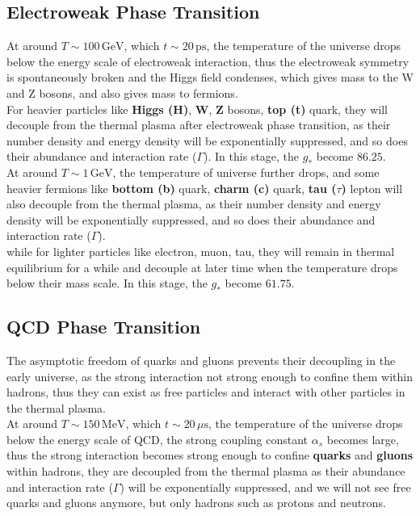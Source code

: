 \subsection{Electroweak Phase Transition}
At around $T \sim 100\,\mathrm{GeV}$, which $t \sim 20\,\mathrm{ps}$, the temperature of the universe drops below the energy scale of electroweak interaction, thus the electroweak symmetry is spontaneously broken and the Higgs field condenses, which gives mass to the W and Z bosons, and also gives mass to fermions. \\

For heavier particles like \textbf{Higgs (H)}, \textbf{W}, \textbf{Z} bosons, \textbf{top (t)} quark, they will decouple from the thermal plasma after electroweak phase transition, as their number density and energy density will be exponentially suppressed, and so does their abundance and interaction rate ($\Gamma$). In this stage, the $g_*$ become $86.25$. \\

At around $T \sim 1\,\mathrm{GeV}$, the temperature of universe further drops, and some heavier fermions like \textbf{bottom (b)} quark, \textbf{charm (c)} quark, \textbf{tau ($\tau$)} lepton will also decouple from the thermal plasma, as their number density and energy density will be exponentially suppressed, and so does their abundance and interaction rate ($\Gamma$). \\

while for lighter particles like electron, muon, tau, they will remain in thermal equilibrium for a while and decouple at later time when the temperature drops below their mass scale. In this stage, the $g_*$ become $61.75$. \\


\subsection{QCD Phase Transition}
The asymptotic freedom of quarks and gluons prevents their decoupling in the early universe, as the strong interaction not strong enough to confine them within hadrons, thus they can exist as free particles and interact with other particles in the thermal plasma. \\

At around $T \sim 150\,\mathrm{MeV}$, which $t \sim 20\,\mu \mathrm{s}$, the temperature of the universe drops below the energy scale of QCD, the strong coupling constant $\alpha_s$ becomes large, thus the strong interaction becomes strong enough to confine \textbf{quarks} and \textbf{gluons} within hadrons, they are decoupled from the thermal plasma as their abundance and interaction rate ($\Gamma$) will be exponentially suppressed, and we will not see free quarks and gluons anymore, but only hadrons such as protons and neutrons. \\

